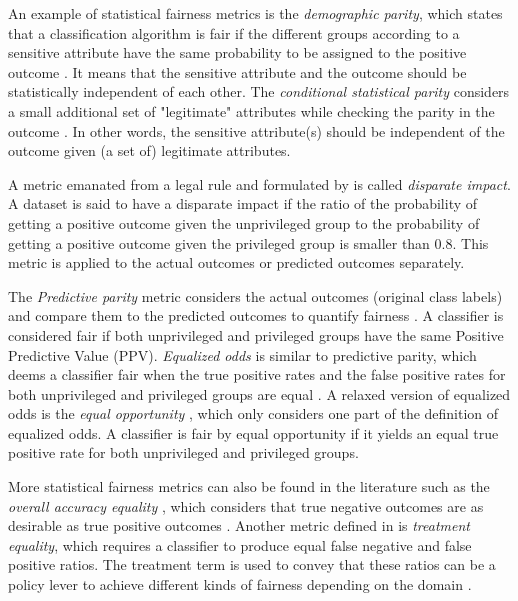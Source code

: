 An example of statistical fairness metrics is the \emph{demographic parity}, which states that a classification algorithm is fair if the different groups according to a sensitive attribute have the same probability to be assigned to the positive outcome \cite{dwork2012fairness,kamishima2011fairness}. It means that the sensitive attribute and the outcome should be statistically independent of each other. The \emph{conditional statistical parity} considers a small additional set of "legitimate" attributes while checking the parity in the outcome \cite{corbett2017algorithmic}. In other words, the sensitive attribute(s) should be independent of the outcome given (a set of) legitimate attributes. 

A metric emanated from a legal rule \cite{US_guideline} and formulated by \citeauthor{feldman2015certifying} is called \emph{disparate impact}. A dataset is said to have a disparate impact if the ratio of the probability of getting a positive outcome given the unprivileged group to the probability of getting a positive outcome given the privileged group is smaller than $0.8$. This metric is applied to the actual outcomes or predicted outcomes separately. 

The \emph{Predictive parity} metric considers the actual outcomes (original class labels) and compare them to the predicted outcomes to quantify fairness \cite{verma2018fairness_explained}. A classifier is considered fair if both unprivileged and privileged groups have the same Positive Predictive Value (PPV). \emph{Equalized odds} is similar to predictive parity, which deems a classifier fair when the true positive rates and the false positive rates for both unprivileged and privileged groups are equal \cite{zafar2017fairness}. A relaxed version of equalized odds is the \emph{equal opportunity} \cite{hardt2016equal_odds_opport}, which only considers one part of the definition of equalized odds. A classifier is fair by equal opportunity if it yields an equal true positive rate for both unprivileged and privileged groups. 


More statistical fairness metrics can also be found in the literature such as the \emph{overall accuracy equality} \cite{berk2018fairness}, which considers that true negative outcomes are as desirable as true positive outcomes \cite{berk2018fairness}. Another metric defined in \cite{berk2018fairness} is \emph{treatment equality}, which requires a classifier to produce equal false negative and false positive ratios. The treatment term is used to convey that these ratios can be a policy lever to achieve different kinds of fairness depending on the domain \cite{berk2018fairness}.


